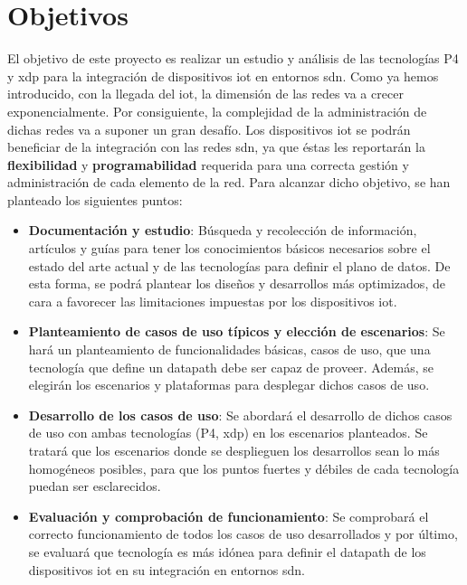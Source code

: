 \section{Objetivos}

El objetivo de este proyecto es realizar un estudio y análisis de las tecnologías P4 y \gls{xdp} para la integración de dispositivos \gls{iot} en entornos \gls{sdn}. Como ya hemos introducido, con la llegada del \gls{iot}, la dimensión de las redes va a crecer exponencialmente. Por consiguiente, la complejidad de la administración de dichas redes va a suponer un gran desafío.  Los dispositivos \gls{iot} se podrán beneficiar de la integración con las redes \gls{sdn}, ya que éstas les reportarán la \textbf{flexibilidad} y \textbf{programabilidad} requerida para una correcta gestión y administración de cada elemento de la red. Para alcanzar dicho objetivo, se han planteado los siguientes puntos:

\begin{itemize}
    \item \textbf{Documentación y estudio}: Búsqueda y recolección de información, artículos y guías para tener
los conocimientos básicos necesarios sobre el estado del arte actual y de las tecnologías para definir el plano de datos. De esta forma, se podrá plantear los diseños y desarrollos más optimizados, de cara a favorecer las limitaciones impuestas por los dispositivos \gls{iot}.

    \item \textbf{Planteamiento de casos de uso típicos y elección de escenarios}: Se hará un planteamiento de funcionalidades básicas, casos de uso, que una tecnología que define un datapath debe ser capaz de proveer. Además, se elegirán los escenarios y plataformas para desplegar dichos casos de uso.
    
    \item  \textbf{Desarrollo de los casos de uso}: Se abordará el desarrollo de dichos casos de uso con ambas tecnologías (P4, \gls{xdp}) en los escenarios planteados. Se tratará que los escenarios donde se desplieguen los desarrollos sean lo más homogéneos posibles, para que los puntos fuertes y débiles de cada tecnología puedan ser esclarecidos. 
    
    \item \textbf{Evaluación y comprobación de funcionamiento}: Se comprobará el correcto funcionamiento de todos los casos de uso desarrollados y por último, se evaluará que tecnología es más idónea para definir el datapath de los dispositivos \gls{iot} en su integración en entornos \gls{sdn}. 
\end{itemize}


